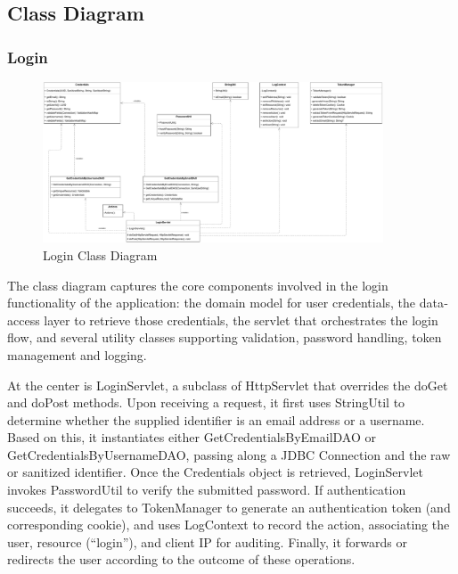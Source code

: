 \subsection{Class Diagram}



\subsubsection{Login}
\begin{figure}[H]
    \centering
    \includegraphics[width=0.9\textwidth]{images/class_diagrams/Login_classdiagram.pdf}
    \caption{Login Class Diagram}
\end{figure}

The class diagram captures the core components involved in the login functionality of the application: the domain model for user credentials, the data‐access layer to retrieve those credentials, the servlet that orchestrates the login flow, and several utility classes supporting validation, password handling, token management and logging.

At the center is LoginServlet, a subclass of HttpServlet that overrides the doGet and doPost methods. Upon receiving a request, it first uses StringUtil to determine whether the supplied identifier is an email address or a username. Based on this, it instantiates either GetCredentialsByEmailDAO or GetCredentialsByUsernameDAO, passing along a JDBC Connection and the raw or sanitized identifier. Once the Credentials object is retrieved, LoginServlet invokes PasswordUtil to verify the submitted password. If authentication succeeds, it delegates to TokenManager to generate an authentication token (and corresponding cookie), and uses LogContext to record the action, associating the user, resource (“login”), and client IP for auditing. Finally, it forwards or redirects the user according to the outcome of these operations.

